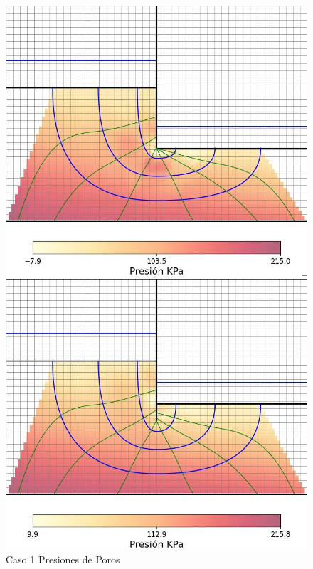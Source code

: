 \begin{figure}[H]
  \centering
  \begin{minipage}{0.32\textwidth}
      \centering
      \includegraphics[width=\textwidth]{FOTOS/caso_1_mapa_calor.jpg}
      \caption{Caso 1 Presiones de Poros}
  \end{minipage}
  \begin{minipage}{0.32\textwidth}
      \centering
      \includegraphics[width=\textwidth]{FOTOS/caso_2_mapa_calor.jpg}

\end{minipage}
\end{figure}
